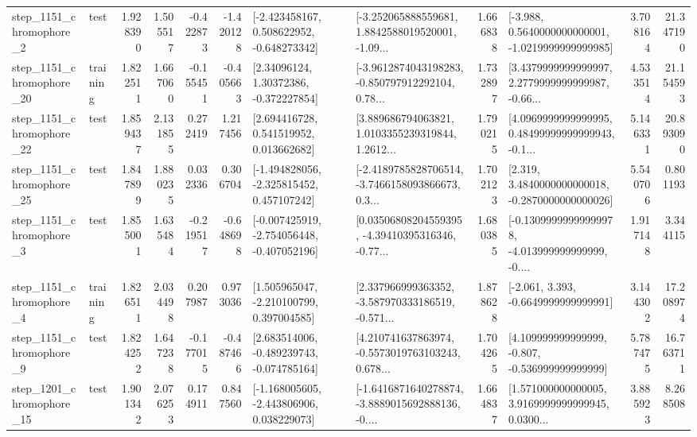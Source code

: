 \begin{tabular}{llrrrrllrlrr}
  step\_1151\_chromophore\_2 &      test &      1.928390 &    1.505517 &     -0.422873 & -1.420128 &   [-2.423458167, 0.508622952, -0.648273342] &  [-3.252065888559681, 1.8842588019520001, -1.09... &       1.666838 &  [-3.988, 0.5640000000000001, -1.0219999999999985] &            3.708164 &         21.347190 \\
 step\_1151\_chromophore\_20 &  training &      1.822511 &    1.667060 &     -0.155451 & -0.405663 &      [2.34096124, 1.30372386, -0.372227854] &  [-3.9612874043198283, -0.850797912292104, 0.78... &       1.732897 &  [3.4379999999999997, 2.2779999999999987, -0.66... &            4.533514 &         21.154593 \\
 step\_1151\_chromophore\_22 &      test &      1.859437 &    2.131855 &      0.272419 &  1.217456 &     [2.694416728, 0.541519952, 0.013662682] &  [3.889686794063821, 1.0103355239319844, 1.2612... &       1.790215 &  [4.0969999999999995, 0.48499999999999943, -0.1... &            5.146331 &         20.893090 \\
 step\_1151\_chromophore\_25 &      test &      1.847899 &    1.880235 &      0.032336 &  0.306704 &   [-1.494828056, -2.325815452, 0.457107242] &  [-2.4189785828706514, -3.7466158093866673, 0.3... &       1.702123 &   [2.319, 3.4840000000000018, -0.2870000000000026] &            5.540706 &          0.801193 \\
  step\_1151\_chromophore\_3 &      test &      1.855001 &    1.635484 &     -0.219517 & -0.648698 &  [-0.007425919, -2.754056448, -0.407052196] &  [0.03506808204559395, -4.39410395316346, -0.77... &       1.680385 &  [-0.13099999999999978, -4.013999999999999, -0.... &            1.917148 &          3.344115 \\
  step\_1151\_chromophore\_4 &  training &      1.826511 &    2.034498 &      0.207987 &  0.973036 &    [1.505965047, -2.210100799, 0.397004585] &  [2.337966999363352, -3.587970333186519, -0.571... &       1.878628 &               [-2.061, 3.393, -0.6649999999999991] &            3.144302 &         17.208974 \\
  step\_1151\_chromophore\_9 &      test &      1.824252 &    1.647238 &     -0.177015 & -0.487466 &   [2.683514006, -0.489239743, -0.074785164] &  [4.210741637863974, -0.5573019763103243, 0.678... &       1.704265 &    [4.109999999999999, -0.807, -0.536999999999999] &            5.787475 &         16.763711 \\
 step\_1201\_chromophore\_15 &      test &      1.901342 &    2.076253 &      0.174911 &  0.847560 &   [-1.168005605, -2.443806906, 0.038229073] &  [-1.6416871640278874, -3.8889015692888136, -0.... &       1.664837 &  [1.571000000000005, 3.9169999999999945, 0.0300... &            3.885923 &          8.268508 \\

\end{tabular}
